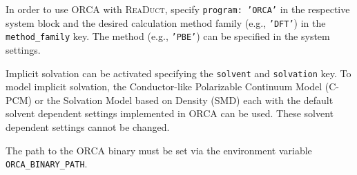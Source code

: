 \documentclass[]{tufte-book}
\begin{document}
In order to use \textsc{ORCA} with \textsc{ReaDuct}, specify \texttt{program: 'ORCA'} in the respective system block and the desired
calculation method family (e.g., \texttt{'DFT'}) in the \texttt{method\_family} key.
The method (e.g., \texttt{'PBE'}) can be specified in the system settings.

Implicit solvation can be activated specifying the \texttt{solvent} and \texttt{solvation} key.
To model implicit solvation, the Conductor-like Polarizable Continuum Model\cite{cpcm} (C-PCM) or the Solvation Model based on Density\cite{smd} (SMD) each with the default solvent dependent settings implemented in \textsc{ORCA} can be used.
These solvent dependent settings cannot be changed.

The path to the \textsc{ORCA} binary must be set via the environment variable \texttt{ORCA\_BINARY\_PATH}.
\end{document}
